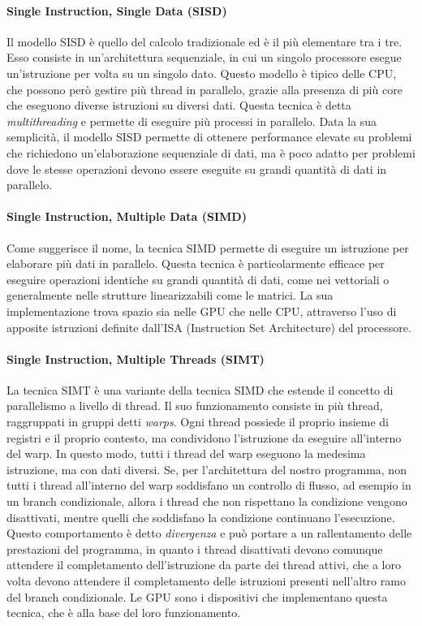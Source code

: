 \paragraph{Single Instruction, Single Data (SISD)}
\label{para:simd}

Il modello SISD è quello del calcolo tradizionale ed è il più elementare tra i
tre. Esso consiste in un'architettura sequenziale, in cui un singolo processore
esegue un'istruzione per volta su un singolo dato. Questo modello è tipico delle
CPU, che possono però gestire più thread in parallelo, grazie alla presenza di più
core che eseguono diverse istruzioni su diversi dati. Questa tecnica è detta
\textit{multithreading} e permette di eseguire più processi in parallelo. Data
la sua semplicità, il modello SISD permette di ottenere performance elevate su problemi
che richiedono un'elaborazione sequenziale di dati, ma è poco adatto per
problemi dove le stesse operazioni devono essere eseguite su grandi quantità di
dati in parallelo.

\paragraph{Single Instruction, Multiple Data (SIMD)}
\label{para:simd}

Come suggerisce il nome, la tecnica SIMD permette di eseguire un istruzione per elaborare
più dati in parallelo. Questa tecnica è particolarmente efficace per eseguire
operazioni identiche su grandi quantità di dati, come nei vettoriali o generalmente
nelle strutture linearizzabili come le matrici. La sua implementazione trova
spazio sia nelle GPU che nelle CPU, attraverso l'uso di apposite istruzioni definite
dall'ISA (Instruction Set Architecture) del processore.

\paragraph{Single Instruction, Multiple Threads (SIMT)\cite{generalpurposegpu}}
\label{para:simt}

La tecnica SIMT è una variante della tecnica SIMD che estende il concetto di parallelismo
a livello di thread. Il suo funzionamento consiste in più thread, raggruppati in
gruppi detti \textit{warps}. Ogni thread possiede il proprio insieme di registri
e il proprio contesto, ma condividono l'istruzione da eseguire all'interno del
warp. In questo modo, tutti i thread del warp eseguono la medesima istruzione, ma
con dati diversi. Se, per l'architettura del nostro programma, non tutti i
thread all'interno del warp soddisfano un controllo di flusso, ad esempio in un branch
condizionale, allora i thread che non rispettano la condizione vengono
disattivati, mentre quelli che soddisfano la condizione continuano l'esecuzione.
Questo comportamento è detto \textit{divergenza} e può portare a un rallentamento
delle prestazioni del programma, in quanto i thread disattivati devono comunque
attendere il completamento dell'istruzione da parte dei thread attivi, che a loro
volta devono attendere il completamento delle istruzioni presenti nell'altro ramo
del branch condizionale. Le GPU sono i dispositivi che implementano questa
tecnica, che è alla base del loro funzionamento.

